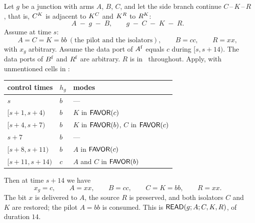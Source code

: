 \begin{lemma}\label{lem:read}
Let $g$ be a junction with arms $A$, $B$, $C$, and let the side branch continue $C\,$--$\,K\,$--$\,R$,
that is, $C^{K}$ is adjacent to $K^{C}$ and $K^{R}$ to $R^{K}$:
\[
A\;-\;g\;-\;B,\qquad g\;-\;C\;-\;K\;-\;R .
\]
Assume at time $s$:
\[
A=C=K=bb\ (\text{the pilot and the isolators}),\qquad B=cc,\qquad R=xx,
\]
with $x_g$ arbitrary. Assume the data port of $A^{\mathrm f}$ equals $c$ during $[s,s+14)$. The
data ports of $B^{\mathrm f}$ and $R^{\mathrm f}$ are arbitrary. $R$ is in \HOLD\ throughout.
Apply, with unmentioned cells in \HOLD:
\begin{center}\small
\begin{tabular}{lll}\toprule
control times & $h_g$ & modes\\\midrule
$s$ & $b$ & ---\\
$[s+1,s+4)$ & $b$ & $K$ in $\textsf{FAVOR}(c)$\\
$[s+4,s+7)$ & $b$ & $K$ in $\textsf{FAVOR}(b)$, $C$ in $\textsf{FAVOR}(c)$\\
$s+7$ & $b$ & ---\\
$[s+8,s+11)$ & $b$ & $A$ in $\textsf{FAVOR}(c)$\\
$[s+11,s+14)$ & $c$ & $A$ and $C$ in $\textsf{FAVOR}(b)$\\\bottomrule
\end{tabular}
\end{center}
Then at time $s+14$ we have
\[
x_g=c,\qquad A=xx,\qquad B=cc,\qquad C=K=bb,\qquad R=xx.
\]
The bit $x$ is delivered to $A$, the source $R$ is preserved, and both isolators $C$ and $K$ are
restored; the pilot $A=bb$ is consumed. This is $\textsf{READ}(g;A;C,K,R)$, of duration $14$.
\end{lemma}

